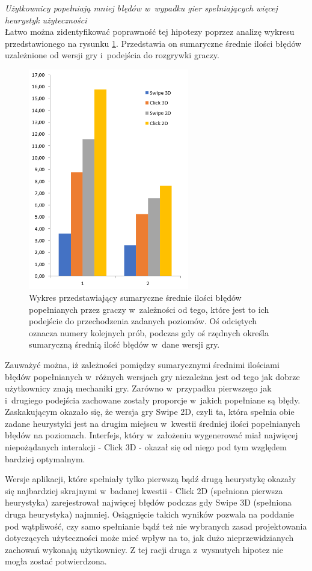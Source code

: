 \documentclass[a4paper,12pt,numbers=noenddot]{report}
\begin{document}
\textit{Użytkownicy popełniają mniej błędów w~wypadku gier spełniających więcej heurystyk użyteczności}\\

Łatwo można zidentyfikować poprawność tej hipotezy poprzez analizę wykresu przedstawionego na rysunku \ref{fig:diag_errors_sum}. Przedstawia on sumaryczne średnie ilości błędów uzależnione od wersji gry i~podejścia do rozgrywki graczy.

\begin{figure}[h!]
	\centering
  	\includegraphics[width=7cm]{diag/errors_sum.png}
	\caption{Wykres przedstawiający sumaryczne średnie ilości błędów popełnianych przez graczy w~zależności od tego, które jest to ich podejście do przechodzenia zadanych poziomów. Oś odciętych oznacza numery kolejnych prób, podczas gdy oś rzędnych określa sumaryczną średnią ilość błędów w~dane wersji gry.}
	\label{fig:diag_errors_sum}
\end{figure}

Zauważyć można, iż zależności pomiędzy sumarycznymi średnimi ilościami błędów popełnianych w~różnych wersjach gry niezależna jest od tego jak dobrze użytkownicy znają mechaniki gry. Zarówno w~przypadku pierwszego jak i~drugiego podejścia zachowane zostały proporcje w~jakich popełniane są błędy. Zaskakującym okazało się, że wersja gry Swipe 2D, czyli ta, która spełnia obie zadane heurystyki jest na drugim miejscu w~kwestii średniej ilości popełnianych błędów na poziomach. Interfejs, który w~założeniu wygenerować miał najwięcej niepożądanych interakcji - Click 3D - okazał się od niego pod tym względem bardziej optymalnym. 

Wersje aplikacji, które spełniały tylko pierwszą bądź drugą heurystykę okazały się najbardziej skrajnymi w~badanej kwestii - Click 2D (spełniona pierwsza heurystyka) zarejestrował najwięcej błędów podczas gdy Swipe 3D (spełniona druga heurystyka) najmniej. 
Osiągnięcie takich wyników pozwala na poddanie pod wątpliwość, czy samo spełnianie bądź też nie wybranych zasad projektowania dotyczących użyteczności może mieć wpływ na to, jak dużo nieprzewidzianych zachowań wykonają użytkownicy. Z tej racji druga z~wysnutych hipotez nie mogła zostać potwierdzona.
\end{document}
